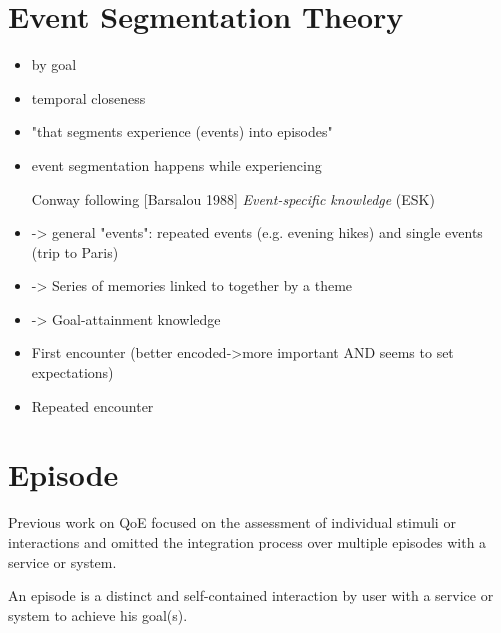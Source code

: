 \section{Event Segmentation Theory}
\cite{black_episodes_1979}\cite{ezzyat_what_2011}\cite{zacks_perceiving_2001}
\begin{itemize}
\item by goal \cite{black_episodes_1979}
\item temporal closeness \cite{black_episodes_1979}\cite{ezzyat_what_2011}
\item "that segments experience (events) into episodes" \cite[p. 248]{ezzyat_what_2011}
\item event segmentation happens while experiencing \cite[p. 248]{ezzyat_what_2011}

\item [Conway] following [Barsalou 1988] \textit{Event-specific knowledge} (ESK)
\item -> general "events": repeated events (e.g. evening hikes) and single events (trip to Paris)
\item -> Series of memories linked to together by a theme
\item -> Goal-attainment knowledge
\item First encounter (better encoded->more important AND seems to set expectations)
\item Repeated encounter
\end{itemize}


\section{Episode}\label{def:episode}
Previous work on \ac{QoE} focused on the assessment of individual stimuli or interactions and omitted the integration process over multiple episodes with a service or system.

\begin{definition}[Episode]
An episode is a distinct and self-contained interaction by user with a service or system to achieve his goal(s).
\end{definition}

